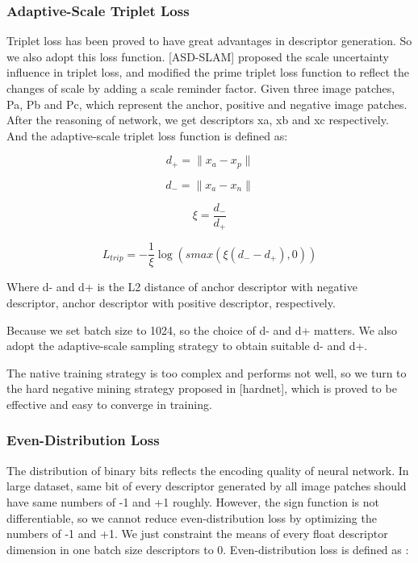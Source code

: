\documentclass[letterpaper, 10 pt, conference]{ieeeconf}  %
\begin{document}
\subsubsection{Adaptive-Scale Triplet Loss} 
Triplet loss has been proved to have great advantages in descriptor generation. So we also adopt this loss function. [ASD-SLAM] proposed the scale uncertainty influence in triplet loss, and modified the prime triplet loss function to reflect the changes of scale by adding a scale reminder factor. Given three image patches, Pa, Pb and Pc, which represent the anchor, positive and negative image patches. After the reasoning of network, we get descriptors xa, xb and xc respectively. And the adaptive-scale triplet loss function is defined as:

\begin{equation}
d _{+} = \| x_{a} - x_{p}  \| 
\end{equation}

\begin{equation}
d _{-} = \| x_{a} - x_{n}  \| 
\end{equation}

\begin{equation}
\xi  = \frac{d _{-}}{d _{+}}
\end{equation}

\begin{equation}
L_{trip}  = - \frac{1}{\xi}\log (smax(\xi( d _{-} - d _{+}  ) , 0)) 
\end{equation}

Where d- and d+ is the L2 distance of anchor descriptor with negative descriptor, anchor descriptor with positive descriptor, respectively. 

Because we set batch size to 1024, so the choice of d- and d+ matters. We also adopt the adaptive-scale sampling strategy to obtain suitable d- and d+.

The native training strategy is too complex and performs not well, so we turn to the hard negative mining strategy proposed in [hardnet], which is proved to be effective and easy to converge in training. 

\subsubsection{Even-Distribution Loss} 
The distribution of binary bits reflects the encoding quality of neural network. In large dataset, same bit of every descriptor generated by all image patches should have same numbers of -1 and +1 roughly. However, the sign function is not differentiable, so we cannot reduce even-distribution loss by optimizing the numbers of -1 and +1. We just constraint the means of every float descriptor dimension in one batch size descriptors to 0. Even-distribution loss is defined as :
\end{document}
